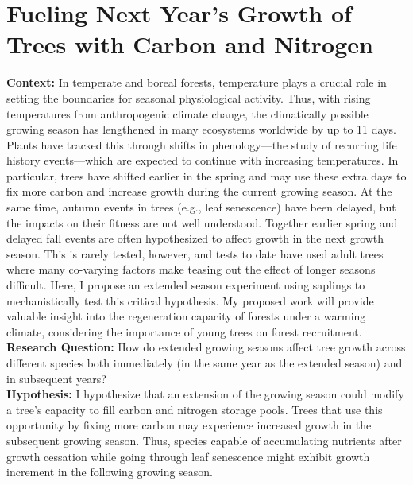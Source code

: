 \documentclass{article}
\begin{document}
\section*{Fueling Next Year's Growth of Trees with Carbon and Nitrogen}
\textbf {Context:} %
In temperate and boreal forests, temperature plays a crucial role in setting the boundaries for seasonal physiological activity. Thus, with rising temperatures from anthropogenic climate change, the climatically possible growing season has lengthened in many ecosystems worldwide by up to 11 days.\citep{korner_phenology_2010, menzel_growing_1999} Plants have tracked this through shifts in phenology—the study of recurring life history events—which are expected to continue with increasing temperatures.\citep{wolkovich_warming_2012} In particular, trees have shifted earlier in the spring and may use these extra days to fix more carbon and increase growth during the current growing season.\citep{keenan_net_2014, wang_interactive_2020} At the same time, autumn events in trees (e.g., leaf senescence) have been delayed, but the impacts on their fitness are not well understood. Together earlier spring and delayed fall events are often hypothesized to affect growth in the next growth season. This is rarely tested, however, and tests to date have used adult trees where many co-varying factors make teasing out the effect of longer seasons difficult. Here, I propose an extended season experiment using saplings to mechanistically test this critical hypothesis. My proposed work will provide valuable insight into the regeneration capacity of forests under a warming climate, considering the importance of young trees on forest recruitment.\citep{zohner_how_2021}
\textbf {Research Question:} How do extended growing seasons affect tree growth across different species both immediately (in the same year as the extended season) and in subsequent years? \\
\textbf {Hypothesis:} I hypothesize that an extension of the growing season could modify a tree’s capacity to fill carbon and nitrogen storage pools.\citep{chapin_ecology_1990, lawrence_variable_2018} Trees that use this opportunity by fixing more carbon may experience increased growth in the subsequent growing season.\citep{landhausser_partitioning_2012, martens_first-year_2007} Thus, species capable of accumulating nutrients after growth cessation while going through leaf senescence might exhibit growth increment in the following growing season.\citep{schott_premature_2013} \\
\end{document}
